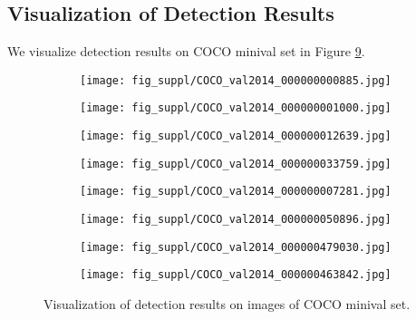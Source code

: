 \documentclass[runningheads]{llncs}
\begin{document}
\subsection{Visualization of Detection Results}
We visualize detection results on COCO minival set in Figure \ref{vis:detection_results}.
\begin{figure}[t]
    \centering
    \begin{subfigure}{.45\textwidth}
		\texttt{[image: fig\_suppl/COCO\_val2014\_000000000885.jpg]}
	    \label{885}
    \end{subfigure}
    \begin{subfigure}{.45\textwidth}
		\texttt{[image: fig\_suppl/COCO\_val2014\_000000001000.jpg]}
	    \label{1000}
    \end{subfigure}
    \begin{subfigure}{.45\textwidth}
		\texttt{[image: fig\_suppl/COCO\_val2014\_000000012639.jpg]}
	    \label{12639}
    \end{subfigure}
    \begin{subfigure}{.45\textwidth}
		\texttt{[image: fig\_suppl/COCO\_val2014\_000000033759.jpg]}
	    \label{33759}
    \end{subfigure}
    \begin{subfigure}{.45\textwidth}
		\texttt{[image: fig\_suppl/COCO\_val2014\_000000007281.jpg]}
	    \label{7281}
    \end{subfigure}
    \begin{subfigure}{.45\textwidth}
		\texttt{[image: fig\_suppl/COCO\_val2014\_000000050896.jpg]}
	    \label{50896}
    \end{subfigure}
    \begin{subfigure}{.45\textwidth}
		\texttt{[image: fig\_suppl/COCO\_val2014\_000000479030.jpg]}
	    \label{479030}
    \end{subfigure}
    \begin{subfigure}{.45\textwidth}
		\texttt{[image: fig\_suppl/COCO\_val2014\_000000463842.jpg]}
	    \label{463842}
    \end{subfigure}
    \caption{Visualization of detection results on images of COCO minival set.}
    \label{vis:detection_results}
\end{figure}    
\end{document}
